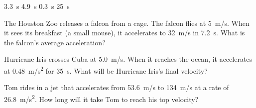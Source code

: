 \documentclass[addpoints]{exam}
\begin{document}
\begin{questions}
\begin{choices}
    \correctchoice \SI{3.3}{s}
    \choice \SI{4.9}{s}
    \choice \SI{0.3}{s}
    \choice \SI{25}{s}
\end{choices}

\clearpage
\question
The Houston Zoo releases a falcon from a cage. The falcon flies at \SI{5}{m/s}. When it sees its breakfast (a small mouse), it accelerates to \SI{32}{m/s} in \SI{7.2}{s}. What is the falcon's average acceleration?

\question
Hurricane Iris crosses Cuba at \SI{5.0}{m/s}. When it reaches the ocean, it accelerates at \SI{0.48}{m/s^2} for \SI{35}{s}. What will be Hurricane Iris's final velocity?

\question 
Tom rides in a jet that accelerates from \SI{53.6}{m/s} to \SI{134}{m/s} at a rate of \SI{26.8}{m/s^2}. How long will it take Tom to reach his top velocity?

\end{questions}
\end{document}
